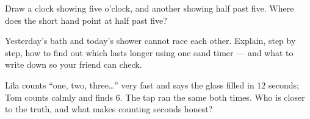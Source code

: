 \begin{exercise}[$\star$]\label{exo:g2:measuring-time:8}
Draw a clock showing five o'clock, and another showing half past
five. Where does the short hand point at half past five?
\end{exercise}

\begin{exercise}[$\star\star$]\label{exo:g2:measuring-time:9}
Yesterday's bath and today's shower cannot race each other. Explain,
step by step, how to find out which lasts longer using one sand
timer --- and what to write down so your friend can check.
\end{exercise}

\begin{exercise}[$\star\star$]\label{exo:g2:measuring-time:10}
Lila counts ``one, two, three\dots'' very fast and says the glass
filled in $12$ seconds; Tom counts calmly and finds $6$. The tap ran
the same both times. Who is closer to the truth, and what makes
counting seconds honest?
\end{exercise}
